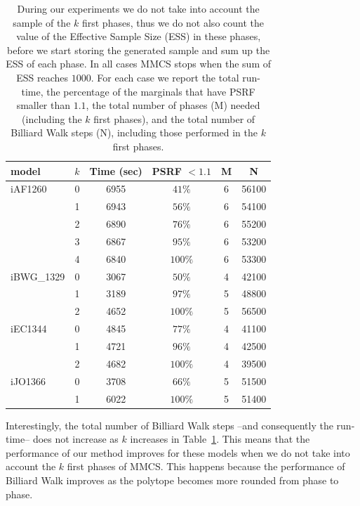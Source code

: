    \begin{table}[t]
      \centering
      \begin{tabular}{|l|c|c|c|c|c|}\hline

      model & $k$  & Time (sec) & PSRF $< 1.1$ &  M & N  \\ \hline 
      iAF1260 & 0 & 6955 & $41\%$ & 6 & 56100\\
      & 1  & 6943 & $56\%$ & 6 & 54100  \\
      & 2  & 6890 & $76\%$ & 6 & 55200 \\
      & 3  & 6867 & $95\%$ & 6 & 53200  \\
      & 4  & 6840 & $100\%$ & 6 & 53300 \\
      \hline
      iBWG\_1329 & 0  & 3067 & $50\%$ & 4 & 42100\\
      & 1  & 3189 & $97\%$ & 5 & 48800 \\
      & 2  & 4652 & $100\%$ & 5 & 56500 \\
      \hline
      iEC1344 & 0  & 4845 & $77\%$ & 4 & 41100 \\
      & 1  & 4721 & $96\%$ & 4 & 42500 \\
      & 2  & 4682 & $100\%$ & 4 & 39500 \\
      \hline
      iJO1366 & 0  & 3708 & $66\%$ & 5 & 51500 \\
      & 1  & 6022 & $100\%$ & 5 & 51400 \\\hline
      \end{tabular}
      
      \caption[MMCS time and PSRF per phase ]{During our experiments we do not take into account the sample of the $k$
         first phases, thus we do not also count the value of the Effective Sample Size
         (ESS) in these phases, before we start storing the generated sample and sum up
         the ESS of each phase. In all cases MMCS stops when the sum of ESS reaches
         $1000$. For each case we report the total run-time, the percentage of the
         marginals that have PSRF smaller than $1.1$, the total number of phases (M)
         needed (including the $k$ first phases), and the total number of Billiard Walk
         steps (N), including those performed in the $k$ first
         phases.\label{tab:skip_phases}}
   \end{table}

   Interestingly, the total number of Billiard Walk steps --and consequently the
   run-time-- does not increase as $k$ increases in Table~\ref{tab:skip_phases}.
   This means that the performance of our method improves for these models when we
   do not take into account the $k$ first phases of MMCS. This happens because the
   performance of Billiard Walk improves as the polytope becomes more rounded from
   phase to phase. 

